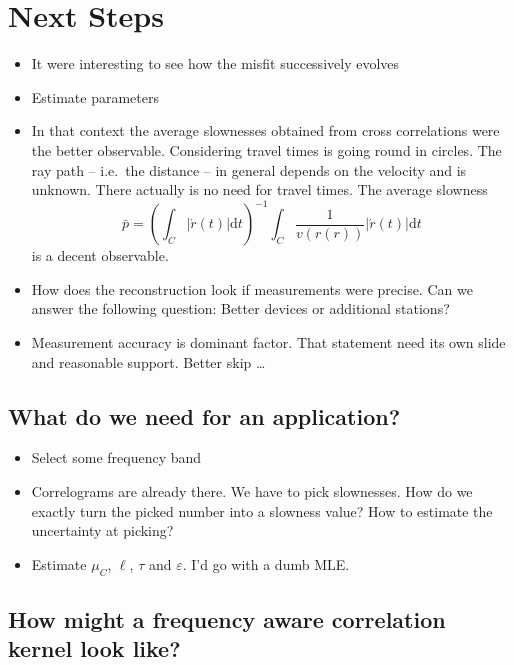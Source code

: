 \documentclass[11pt]{article}
\begin{document}
\section{Next Steps}

\begin{itemize}
    \item It were interesting to see how the misfit successively evolves
    \item Estimate parameters
    \item In that context the average slownesses obtained from cross correlations were the better observable.
        Considering travel times is going round in circles.
        The ray path -- i.e.~the distance -- in general depends on the velocity and is unknown.
        There actually is no need for travel times.
        The average slowness
        \begin{equation}
            \bar p = \left(\int_C |\acute r(t)| \mathrm d t \right)^{-1} \int_C \frac 1 {v(r(r))} |\acute r(t)| \mathrm d t
        \end{equation}
        is a decent observable.
    \item How does the reconstruction look if measurements were precise.
        Can we answer the following question: Better devices or additional stations?
    \item Measurement accuracy is dominant factor.
    That statement need its own slide and reasonable support.
    Better skip \dots

\end{itemize}

\subsection{What do we need for an application?}

\begin{itemize}
    \item Select some frequency band
    \item Correlograms are already there. We have to pick slownesses. How do we exactly turn the picked number into a slowness value? How to estimate the uncertainty at picking?
    \item Estimate $\mu_C$, $\ell$, $\tau$ and $\varepsilon$. I'd go with a dumb MLE.
\end{itemize}

\subsection{How might a frequency aware correlation kernel look like?}
\end{document}
